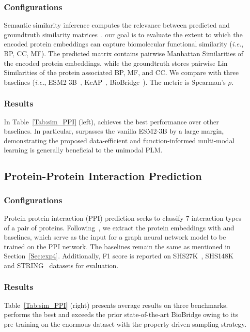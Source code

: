 \subsubsection{Configurations}
Semantic similarity inference computes the relevance between predicted and groundtruth similarity matrices~\cite{exp_sim}. our goal is to evaluate the extent to which the encoded protein embeddings can capture biomolecular functional similarity (\textit{i.e.}, BP, CC, MF). The predicted matrix contains pairwise Manhattan Similarities of the encoded protein embeddings, while the groundtruth stores pairwise Lin Similarities of the protein associated BP, MF, and CC. We compare \ourapproach with three baselines (\textit{i.e.}, ESM2-3B~\cite{esm-2}, KeAP~\cite{KeAP}, BioBridge~\cite{BioBridge}). The metric is Spearman's $\rho$.
\subsubsection{Results}
In Table~\ref{Tab:sim_PPI} (left), \ourapproach achieves the best performance over other baselines. In particular, \ourapproach 
surpasses the vanilla ESM2-3B by a large margin, demonstrating the proposed data-efficient and function-informed multi-modal learning is generally beneficial to the unimodal PLM.

\subsection{Protein-Protein Interaction Prediction}
\subsubsection{Configurations}
Protein-protein interaction (PPI) prediction seeks to classify 7 interaction types of a pair of proteins. Following~\cite{OntoProtein}, we extract the protein embeddings with \ourapproach and baselines, which serve as the input for a graph neural network model to be trained on the PPI network. The
baselines remain the same as mentioned in Section~\ref{Sec:exp4}. Additionally, F1 score is reported on SHS27K~\cite{SHSdataset}, SHS148K~\cite{SHSdataset} and STRING~\cite{STRING} datasets for evaluation.
\subsubsection{Results}
Table~\ref{Tab:sim_PPI} (right) presents average results on three benchmarks. \ourapproach performs the best and exceeds the prior state-of-the-art BioBridge owing to its pre-training on the enormous dataset \ourdatasetD with the property-driven sampling strategy.

